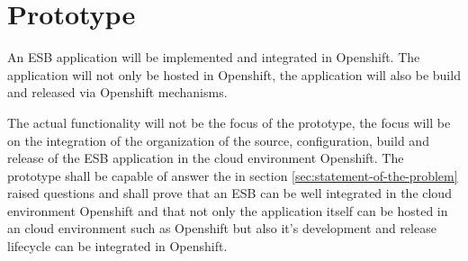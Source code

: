 \section{Prototype}
\label{sec:prototype}
An ESB application will be implemented and integrated in Openshift. The application will not only be hosted in Openshift, the application will also be build and released via Openshift mechanisms.

The actual functionality will not be the focus of the prototype, the focus will be on the integration of the organization of the source, configuration, build and release of the ESB application in the cloud environment Openshift. The prototype shall be capable of answer the in section \ref{sec:statement-of-the-problem} raised questions and shall prove that an ESB can be well integrated in the cloud environment Openshift and that not only the application itself can be hosted in an cloud environment such as Openshift but also it's development and release lifecycle can be integrated in Openshift.





 